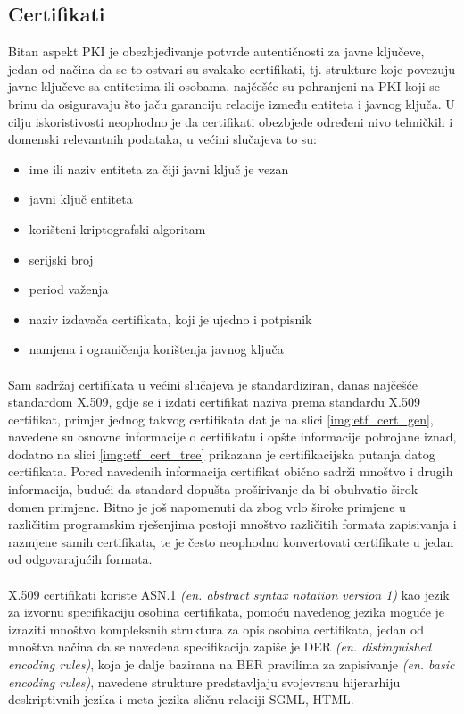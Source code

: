 \subsection{Certifikati}
Bitan aspekt PKI je obezbjeđivanje potvrde autentičnosti za javne ključeve, jedan od načina da se to ostvari su svakako certifikati, tj. strukture koje povezuju javne ključeve sa entitetima ili osobama, najčešće su pohranjeni na PKI koji se brinu da osiguravaju što jaču garanciju relacije između entiteta i javnog ključa. U cilju iskoristivosti neophodno je da certifikati obezbjede određeni nivo tehničkih i domenski relevantnih podataka, u većini slučajeva to su:

\begin{itemize}
    \item ime ili naziv entiteta za čiji javni ključ je vezan
    \item javni ključ entiteta
    \item korišteni kriptografski algoritam
    \item serijski broj
    \item period važenja
    \item naziv izdavača certifikata, koji je ujedno i potpisnik
    \item namjena i ograničenja korištenja javnog ključa
\end{itemize}

\paragraph*{}
Sam sadržaj certifikata u većini slučajeva je standardiziran, danas najčešće standardom X.509, gdje se i izdati certifikat naziva prema standardu X.509 certifikat, primjer jednog takvog certifikata dat je na slici \ref{img:etf_cert_gen}, navedene su osnovne informacije o certifikatu i opšte informacije pobrojane iznad, dodatno na slici \ref{img:etf_cert_tree} prikazana je certifikacijska putanja datog certifikata. Pored navedenih informacija certifikat obično sadrži mnoštvo i drugih informacija, budući da standard dopušta proširivanje da bi obuhvatio širok domen primjene. Bitno je još napomenuti da zbog vrlo široke primjene u različitim programskim rješenjima postoji mnoštvo različitih formata zapisivanja i razmjene samih certifikata, te je često neophodno konvertovati certifikate u jedan od odgovarajućih formata.

\paragraph*{}
X.509 certifikati koriste ASN.1 \textit{(en. abstract syntax notation version 1)} kao jezik za izvornu specifikaciju osobina certifikata, pomoću navedenog jezika moguće je izraziti mnoštvo kompleksnih struktura za opis osobina certifikata, jedan od mnoštva načina da se navedena specifikacija zapiše je DER \textit{(en. distinguished encoding rules)}, koja je dalje bazirana na BER pravilima za zapisivanje \textit{(en. basic encoding rules)}, navedene strukture predstavljaju svojevrsnu hijerarhiju deskriptivnih jezika i meta-jezika sličnu relaciji SGML, HTML.

